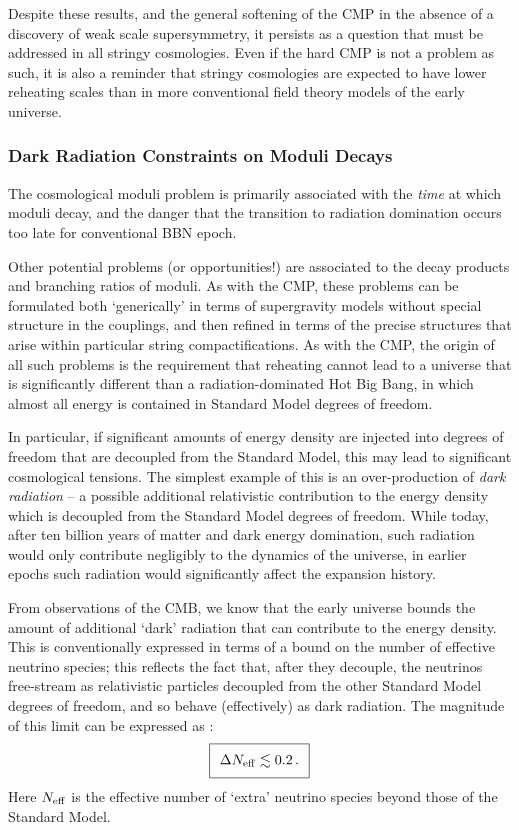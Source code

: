 Despite these results, and the general softening of the CMP in the absence of a discovery of weak scale supersymmetry, it persists as a question that must be addressed in all stringy cosmologies. Even if the hard CMP is not a problem as such, it is also a reminder that stringy cosmologies are expected to have lower reheating scales than in more conventional field theory models of the early universe.

\subsubsection{Dark Radiation Constraints on Moduli Decays}

The cosmological moduli problem is primarily associated with the \emph{time} at which moduli decay, and the danger that the transition to radiation domination occurs too late for conventional BBN epoch.

Other potential problems (or opportunities!) are associated to the decay products and branching ratios of moduli. As with the CMP, these problems can be formulated both  `generically' in terms of supergravity models without special structure in the couplings, and then refined in terms of the precise structures that arise within particular string compactifications. As with the CMP, the origin of all such problems is the requirement that reheating cannot lead to a universe that is significantly different than a radiation-dominated Hot Big Bang, in which almost all energy is contained in Standard Model degrees of freedom.

In particular, if significant amounts of energy density are injected into degrees of freedom that are decoupled from the Standard Model, this may lead to significant cosmological tensions. The simplest example of this is an over-production of \emph{dark radiation} -- a possible additional relativistic contribution to the energy density which is decoupled from the Standard Model degrees of freedom. While today, after ten billion years of matter and dark energy domination, such radiation would only contribute negligibly to the dynamics of the universe, in earlier epochs such radiation would significantly affect the expansion history. 

From observations of the CMB, we know that the early universe bounds the amount of additional `dark' radiation that can contribute to the energy density. This is conventionally expressed in terms of a bound on the number of effective neutrino species; this reflects the fact that, after they decouple, the neutrinos free-stream as relativistic particles decoupled from the other Standard Model degrees of freedom, and so behave (effectively) as dark radiation.
The magnitude of this limit can be expressed as \cite{Planck:2018vyg}:
\begin{equation}
\setlength\fboxsep{0.25cm}
\setlength\fboxrule{0.4pt}
\boxed{
\Delta N_{\rm eff} \lesssim 0.2\,.
}
\end{equation}
Here $N_{\rm eff}$ is the effective number of `extra' neutrino species beyond those of the Standard Model.

